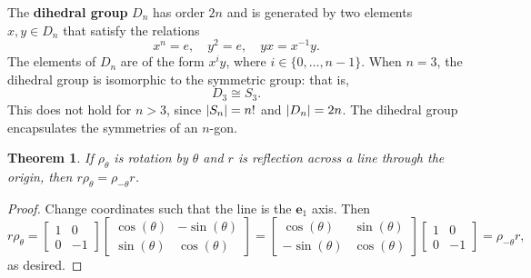 \documentclass[11pt]{article}
\renewcommand{\vec}[1]{\mathbf{#1}}
\newtheorem{theorem}{Theorem}
\begin{document}
The \textbf{dihedral group} $D_{n}$ has order $2n$ and is generated by two elements $x, y \in D_{n}$ that satisfy the relations
\[
	x^{n} = e, \quad y^{2} = e, \quad yx = x^{-1}y.
\]
The elements of $D_{n}$ are of the form $x^{i}y$, where $i \in \{ 0, \ldots, n - 1 \}$. When $n = 3$, the dihedral group is isomorphic to the symmetric group: that is,
\[
	D_{3} \cong S_{3}.
\]
This does not hold for $n > 3$, since $\abs{S_{n}} = n!$ and $\abs{D_{n}} = 2n$. The dihedral group encapsulates the symmetries of an $n$-gon.

\begin{adjustwidth}{1cm}{}
	\begin{theorem}
		If $\rho_{\theta}$ is rotation by $\theta$ and $r$ is reflection across a line through the origin, then $r \rho_{\theta} = \rho_{-\theta} r$.
	\end{theorem}
	\begin{proof}
		Change coordinates such that the line is the $\vec{e}_{1}$ axis. Then
		\newpage
		\[
			r \rho_{\theta} = \begin{bmatrix} 1 & 0 \\ 0 & -1 \end{bmatrix} \begin{bmatrix} \cos(\theta) & -\sin(\theta) \\ \sin(\theta) & \cos(\theta) \end{bmatrix} = \begin{bmatrix} \cos(\theta) & \sin(\theta) \\ - \sin(\theta) & \cos(\theta) \end{bmatrix} \begin{bmatrix} 1 & 0 \\ 0 & -1 \end{bmatrix} = \rho_{-\theta} r,
		\]
		as desired.
	\end{proof}
\end{adjustwidth}
\end{document}

